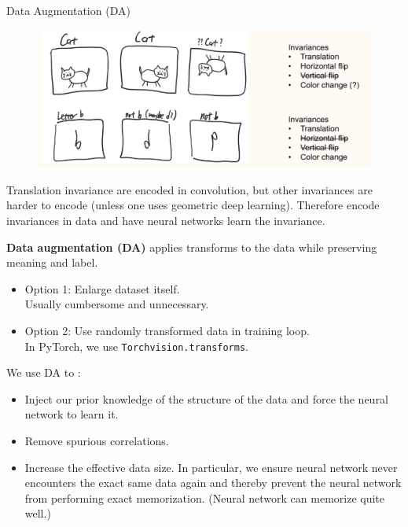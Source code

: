 \begin{frame}[allowframebreaks]

\begin{mydefinitionblock}{6.2}{Data Augmentation (DA)}
    \begin{figure}[H]
        \centering
        \includegraphics[width=1.0\textwidth]{.././assets/6.1.png}
    \end{figure}

    Translation invariance are encoded in convolution, but other invariances are harder to encode (unless one uses geometric deep learning).
    Therefore encode invariances in data and have neural networks learn the invariance.

    \par\noindent\textcolor{gray}{\hdashrule{\textwidth}{0.4pt}{1pt 2pt}}

    \textbf{Data augmentation (DA)} applies transforms to the data while preserving meaning and label.

    \begin{itemize}
        \item
        Option 1: Enlarge dataset itself.\\

        Usually cumbersome and unnecessary.
        \item
        Option 2: Use randomly transformed data in training loop.\\

        In PyTorch, we use \verb|Torchvision.transforms|.
    \end{itemize}

    \par\noindent\textcolor{gray}{\hdashrule{\textwidth}{0.4pt}{1pt 2pt}}

    We use DA to :

    \begin{itemize}
        \item Inject our prior knowledge of the structure of the data and force the neural network to learn it.
        \item Remove spurious correlations.
        \item Increase the effective data size. In particular, we ensure neural network never encounters the exact same data again and thereby prevent the neural network from performing exact memorization. (Neural network can memorize quite well.)
    \end{itemize}


\end{mydefinitionblock}
\end{frame}
